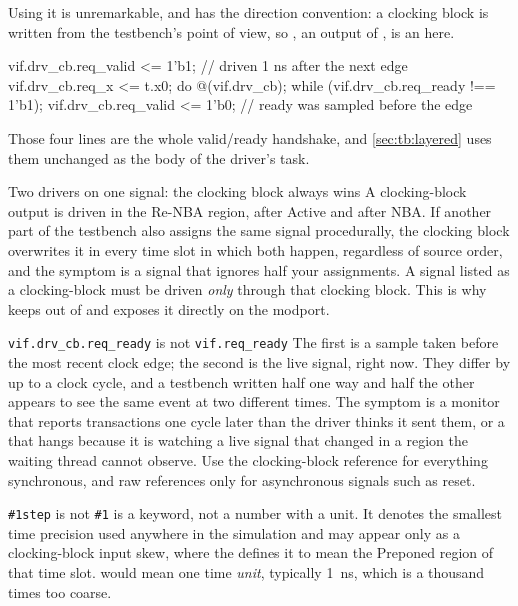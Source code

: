 Using it is unremarkable, and  has the direction
convention: a clocking block is written from the testbench's point of view, so
, an output of , is an  here.

\begin{svcode}
vif.drv_cb.req_valid <= 1'b1;      // driven 1 ns after the next edge
vif.drv_cb.req_x     <= t.x0;
do @(vif.drv_cb); while (vif.drv_cb.req_ready !== 1'b1);
vif.drv_cb.req_valid <= 1'b0;      // ready was sampled before the edge
\end{svcode}

Those four lines are the whole valid/ready handshake, and
\cref{sec:tb:layered} uses them unchanged as the body of the driver's
 task.

\begin{gotcha}{Two drivers on one signal: the clocking block always wins}
A clocking-block output is driven in the Re-NBA region, after Active and after
NBA. If another part of the testbench also assigns the same signal
procedurally, the clocking block overwrites it in every time slot in which both
happen, regardless of source order, and the symptom is a signal that ignores
half your assignments. A signal listed as a clocking-block  must
be driven \emph{only} through that clocking block. This is why
 keeps  out of  and exposes it
directly on the  modport.
\end{gotcha}

\begin{gotcha}{\texttt{vif.drv\_cb.req\_ready} is not \texttt{vif.req\_ready}}
The first is a sample taken before the most recent clock edge; the second is
the live signal, right now. They differ by up to a clock cycle, and a testbench
written half one way and half the other appears to see the same event at two
different times. The symptom is a monitor that reports transactions one cycle
later than the driver thinks it sent them, or a  that hangs because
it is watching a live signal that changed in a region the waiting thread cannot
observe. Use the clocking-block reference for everything synchronous, and raw
references only for asynchronous signals such as reset.
\end{gotcha}

\begin{notebox}{\texttt{\#1step} is not \texttt{\#1}}
 is a keyword, not a number with a unit. It denotes the smallest
time precision used anywhere in the simulation and may appear only as a
clocking-block input skew, where the \LRM{} defines it to mean the Preponed
region of that time slot.  would mean one time \emph{unit},
typically \SI{1}{\nano\second}, which is a thousand times too coarse.
\end{notebox}

